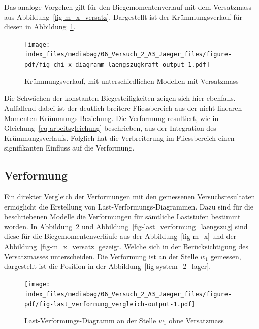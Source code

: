 \documentclass[
  12pt,
  letterpaper,
  egregdoesnotlikesansseriftitles]{scrreprt}
\begin{document}
Das analoge Vorgehen gilt für den Biegemomentenverlauf mit dem
Versatzmass aus Abbildung~\ref{fig-m_x_versatz}. Dargestellt ist der
Krümmungsverlauf für diesen in
Abbildung~\ref{fig-chi_x_diagramm_laengszugkraft}.

\begin{figure}[H]

{\centering \texttt{[image: index\_files/mediabag/06\_Versuch\_2\_A3\_Jaeger\_files/figure-pdf/fig-chi\_x\_diagramm\_laengszugkraft-output-1.pdf]}

}

\caption{\label{fig-chi_x_diagramm_laengszugkraft}Krümmungsverlauf, mit
unterschiedlichen Modellen mit Versatzmass}

\end{figure}

Die Schwächen der konstanten Biegesteifigkeiten zeigen sich hier
ebenfalls. Auffallend dabei ist der deutlich breitere Fliessbereich aus
der nicht-linearen Momenten-Krümmungs-Beziehung. Die Verformung
resultiert, wie in Gleichung~\ref{eq-arbeitsgleichung} beschrieben, aus
der Integration des Krümmungsverlaufs. Folglich hat die Verbreiterung im
Fliessbereich einen signifikanten Einfluss auf die Verformung.

\hypertarget{verformung}{%
\subsection{Verformung}\label{verformung}}

Ein direkter Vergleich der Verformungen mit den gemessenen
Versuchsresultaten ermöglicht die Erstellung von
Last-Verformungs-Diagrammen. Dazu sind für die beschriebenen Modelle die
Verformungen für sämtliche Laststufen bestimmt worden. In
Abbildung~\ref{fig-last_verformung_vergleich} und
Abbildung~\ref{fig-last_verformung_laengszug} sind diese für die
Biegemomentenverläufe aus der Abbildung~\ref{fig-m_x} und der
Abbildung~\ref{fig-m_x_versatz} gezeigt. Welche sich in der
Berücksichtigung des Versatzmasses unterscheiden. Die Verformung ist an
der Stelle \(w_1\) gemessen, dargestellt ist die Position in der
Abbildung~\ref{fig-system_2_lager}.

\begin{figure}[H]

{\centering \texttt{[image: index\_files/mediabag/06\_Versuch\_2\_A3\_Jaeger\_files/figure-pdf/fig-last\_verformung\_vergleich-output-1.pdf]}

}

\caption{\label{fig-last_verformung_vergleich}Last-Verformungs-Diagramm
an der Stelle \(w_1\) ohne Versatzmass}

\end{figure}
\end{document}
